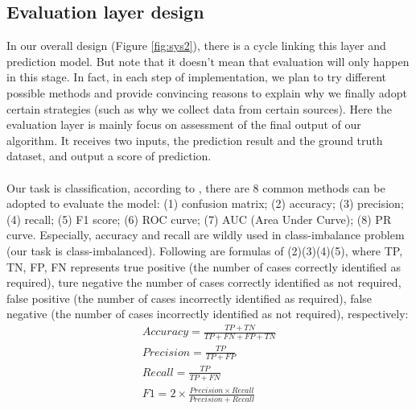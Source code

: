 \subsection{Evaluation layer design}
In our overall design (Figure \ref{fig:sys2}), there is a cycle linking this layer and prediction model. But note that it doesn't mean that evaluation will only happen in this stage. In fact, in each step of implementation, we plan to try different possible methods and provide convincing reasons to explain why we finally adopt certain strategies (such as why we collect data from certain sources). Here the evaluation layer is mainly focus on assessment of the final output of our algorithm. It receives two inputs, the prediction result and the ground truth dataset, and output a score of prediction. \\
\\Our task is classification, according to \cite{Chollet:2017:DLP:3203489}, there are 8 common methods can be adopted to evaluate the model: (1) confusion matrix; (2) accuracy; (3) precision; (4) recall; (5) F1 score; (6) ROC curve; (7) AUC (Area Under Curve); (8) PR curve. Especially, accuracy and recall are wildly used in class-imbalance problem (our task is class-imbalanced). Following are formulas of (2)(3)(4)(5), where TP, TN, FP, FN represents true positive (the number of cases correctly identified as required), ture negative the number of cases correctly identified as not required, false positive (the number of cases incorrectly identified as required), false negative (the number of cases incorrectly identified as not required), respectively:
\begin{displaymath}
    \begin{array}{c}
        Accuracy = \frac{TP+TN}{TP+FN+FP+TN} \\
        Precision = \frac{TP}{TP+FP}\\
        Recall = \frac{TP}{TP+FN}\\
        F1 = 2\times\frac{Precision \times Recall}{Precision + Recall}
    \end{array}
\end{displaymath}
